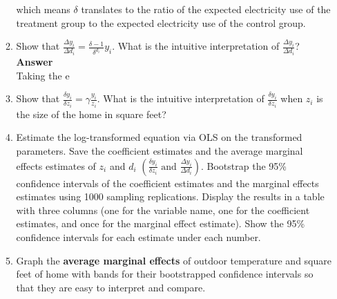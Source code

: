 \documentclass{article}
\begin{document}
\begin{enumerate}
\begin{enumerate}
    which means $\delta$ translates to the ratio of the expected electricity use of the treatment group to the expected electricity use of the control group.
    \item Show that $\frac{\Delta y_i}{\Delta d_i}=\frac{\delta-1}{\delta^{d_i}}y_i$. What is the intuitive interpretation of $\frac{\Delta y_i}{\Delta d_i}$?
    \\\textbf{Answer}\\
    Taking the e
    \item Show that $\frac{\delta y_i}{\delta z_i}=\gamma\frac{y_i}{z_i}$. What is the intuitive interpretation of $\frac{\delta y_i}{\delta z_i}$ when $z_i$ is the size of the home in square feet?
    \item Estimate the log-transformed equation via OLS on the transformed parameters. Save the coefficient estimates and the average marginal effects estimates of $z_i$ and $d_i$ $\left(\frac{\delta y_i}{\delta z_i}\text{ and }\frac{\Delta y_i}{\Delta d_i}\right)$. Bootstrap the 95\% confidence intervals of the coefficient estimates and the marginal effects estimates using 1000 sampling replications. Display the results in a table with three columns (one for the variable name, one for the coefficient estimates, and once for the marginal effect estimate). Show the 95\% confidence intervals for each estimate under each number.
    \item Graph the \textbf{average marginal effects} of outdoor temperature and square feet of home with bands for their bootstrapped confidence intervals so that they are easy to interpret and compare.
\end{enumerate}


\end{enumerate}
\end{document}
